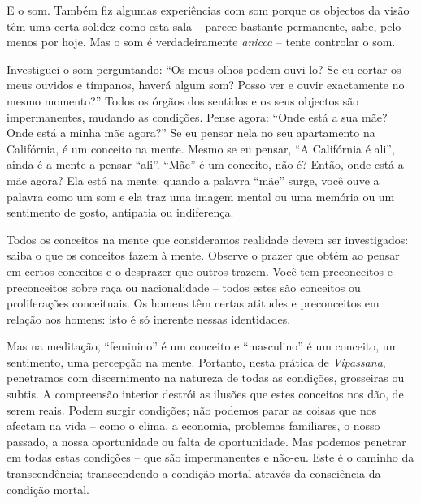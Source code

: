 E o som. Também fiz algumas experiências com som porque os objectos da visão têm
uma certa solidez como esta sala -- parece bastante permanente, sabe, pelo menos
por hoje. Mas o som é verdadeiramente \emph{anicca} -- tente controlar o som.

Investiguei o som perguntando: ``Os meus olhos podem ouvi-lo? Se eu cortar os
meus ouvidos e tímpanos, haverá algum som? Posso ver e ouvir exactamente no
mesmo momento?'' Todos os órgãos dos sentidos e os seus objectos são
impermanentes, mudando as condições. Pense agora: ``Onde está a sua mãe? Onde
está a minha mãe agora?'' Se eu pensar nela no seu apartamento na Califórnia, é
um conceito na mente. Mesmo se eu pensar, ``A Califórnia é ali'', ainda é a
mente a pensar ``ali''. ``Mãe'' é um conceito, não é? Então, onde está a mãe
agora? Ela está na mente: quando a palavra ``mãe'' surge, você ouve a palavra
como um som e ela traz uma imagem mental ou uma memória ou um sentimento de
gosto, antipatia ou indiferença.

Todos os conceitos na mente que consideramos realidade devem ser investigados:
saiba o que os conceitos fazem à mente. Observe o prazer que obtém ao pensar em
certos conceitos e o desprazer que outros trazem. Você tem preconceitos e
preconceitos sobre raça ou nacionalidade -- todos estes são conceitos ou
proliferações conceituais. Os homens têm certas atitudes e preconceitos em
relação aos homens: isto é só inerente nessas identidades.

Mas na meditação, ``feminino'' é um conceito e ``masculino'' é um conceito, um
sentimento, uma percepção na mente. Portanto, nesta prática de \emph{Vipassana},
penetramos com discernimento na natureza de todas as condições, grosseiras ou
subtis. A compreensão interior destrói as ilusões que estes conceitos nos dão,
de serem reais. Podem surgir condições; não podemos parar as coisas que nos
afectam na vida -- como o clima, a economia, problemas familiares, o nosso
passado, a nossa oportunidade ou falta de oportunidade. Mas podemos penetrar em
todas estas condições -- que são impermanentes e não-eu. Este é o caminho da
transcendência; transcendendo a condição mortal através da consciência da
condição mortal.

